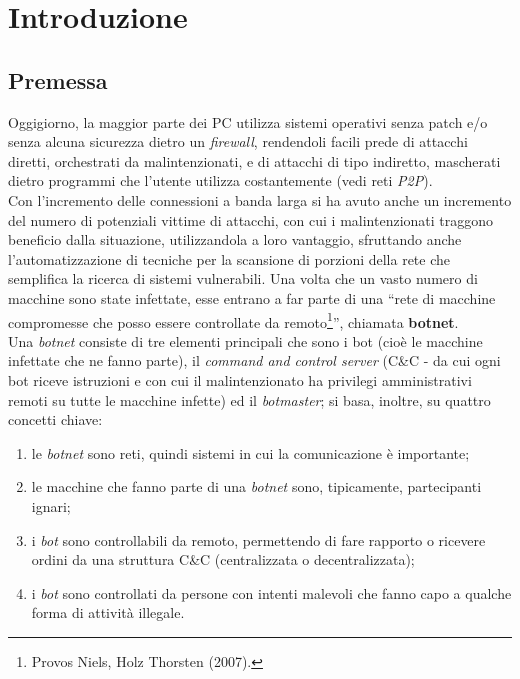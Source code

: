 \chapter{Introduzione}
\section{Premessa}
Oggigiorno, la maggior parte dei PC utilizza sistemi operativi senza patch e/o senza alcuna sicurezza dietro un \textit{firewall}, rendendoli facili prede di attacchi diretti, orchestrati da malintenzionati, e di attacchi di tipo indiretto, mascherati dietro programmi che l'utente utilizza costantemente (vedi reti \textit{P2P}).\\
Con l'incremento delle connessioni a banda larga si ha avuto anche un incremento del numero di potenziali vittime di attacchi, con cui i malintenzionati traggono beneficio dalla situazione, utilizzandola a loro vantaggio, sfruttando anche l'automatizzazione di tecniche per la scansione di porzioni della rete che semplifica la ricerca di sistemi vulnerabili. Una volta che un vasto numero di macchine sono state infettate, esse entrano a far parte di una ``rete di macchine compromesse che posso essere controllate da remoto\footnote{Provos Niels, Holz Thorsten (2007).}'', chiamata \textbf{botnet}.\\
Una \textit{botnet} consiste di tre elementi principali che sono i bot (cio\`e le macchine infettate che ne fanno parte), il \textit{command and control server} (C\&C - da cui ogni bot riceve istruzioni e con cui il malintenzionato ha privilegi amministrativi remoti su tutte le macchine infette) ed il \textit{botmaster}; si basa, inoltre, su quattro concetti chiave:
\begin{enumerate}
\item le \textit{botnet} sono reti, quindi sistemi in cui la comunicazione \`e importante;
\item le macchine che fanno parte di una \textit{botnet} sono, tipicamente, partecipanti ignari;
\item i \textit{bot} sono controllabili da remoto, permettendo di fare rapporto o ricevere ordini da una struttura C\&C (centralizzata o decentralizzata);
\item i \textit{bot} sono controllati da persone con intenti malevoli che fanno capo a qualche forma di attivit\`{a} illegale.
\end{enumerate}

\vspace*{1cm}
